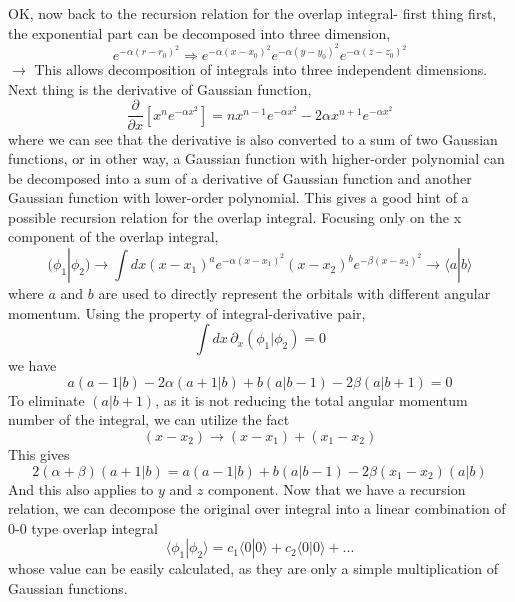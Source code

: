 \documentclass[12pt,a4paper,openany,twoside]{article}
\numberwithin{equation}{section}
\begin{document}
OK, now back to the recursion relation for the overlap integral- first thing first, the exponential part can be decomposed into three dimension,
\begin{equation}
    e^{-\alpha (r - r_0)^2} \Rightarrow e^{-\alpha (x-x_0)^2} e^{-\alpha (y-y_0)^2} e^{-\alpha (z-z_0)^2}
\end{equation}
$\rightarrow$ This allows decomposition of integrals into three independent dimensions. Next thing is the derivative of Gaussian function,
\begin{equation}
    \frac{\partial}{\partial x} [x^n e^{-\alpha x^2}] = n x^{n-1} e^{-\alpha x^2}- 2\alpha x^{n+1} e^{-\alpha x^2}
\end{equation}
where we can see that the derivative is also converted to a sum of two Gaussian functions, or in other way, a Gaussian function with higher-order polynomial can be decomposed into a sum of a derivative of Gaussian function and another Gaussian function with lower-order polynomial. This gives a good hint of a possible recursion relation for the overlap integral. Focusing only on the x component of the overlap integral,
\begin{equation}
    ( \phi_1 | \phi_2 ) \rightarrow \int dx (x-x_1)^a e^{-\alpha (x-x_1)^2} (x-x_2)^b e^{-\beta (x-x_2)^2} \rightarrow \langle a | b \rangle
\end{equation}
where $a$ and $b$ are used to directly represent the orbitals with different angular momentum. Using the property of integral-derivative pair,
    \begin{equation}
        \int dx \, \partial_x ( \phi_1 | \phi_2 ) = 0
    \end{equation} 
    we have
    \begin{equation}
        a ( a-1 | b ) - 2 \alpha ( a + 1 | b ) + b (a | b - 1 ) - 2 \beta ( a | b +1 ) = 0
    \end{equation}
    To eliminate $( a | b + 1 )$, as it is not reducing the total angular momentum number of the integral, we can utilize the fact
\begin{equation}
    (x - x_2) \rightarrow (x-x_1) + (x_1 - x_2)
\end{equation}
This gives
\begin{equation}
    2 (\alpha + \beta ) ( a + 1 | b ) = a ( a-1 | b ) + b ( a | b - 1 ) - 2\beta(x_1 - x_2) ( a | b )
\end{equation}
And this also applies to $y$ and $z$ component. Now that we have a recursion relation, we can decompose the original over integral into a linear combination of 0-0 type overlap integral
\begin{equation}
    \langle \phi_1 | \phi_2 \rangle = c_1 \langle 0 | 0 \rangle + c_2 \langle 0 | 0 \rangle + ...
\end{equation}
whose value can be easily calculated, as they are only a simple multiplication of Gaussian functions. 
\end{document}
